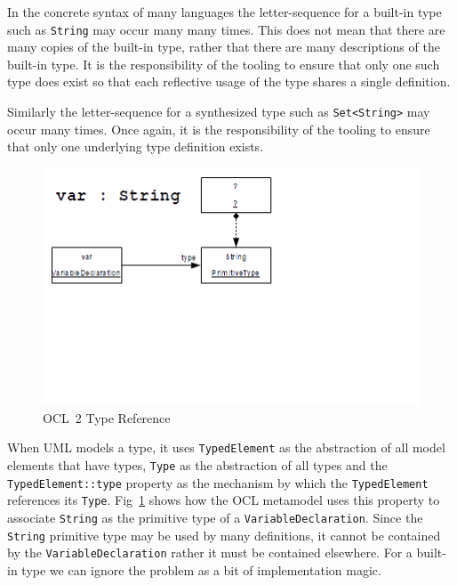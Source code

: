 \documentclass{jot}
\begin{document}
In the concrete syntax of many languages the letter-sequence for a built-in type such as \verb$String$ may occur many many times. This does not mean that there are many copies of the built-in type, rather that there are many descriptions of the built-in type. It is the responsibility of the tooling to ensure that only one such type does exist so that each reflective usage of the type shares a single definition.

Similarly the letter-sequence for a synthesized type such as \verb$Set<String>$ may occur many times. Once again, it is the responsibility of the tooling to ensure that only one underlying type definition exists.

\begin{figure}
	\begin{center}
		\includegraphics[width=4.5in]{OCL2TypeReference.png}
	\end{center}
	\vspace{-110pt}
	\caption{OCL~2 Type Reference}
	\label{fig:OCL2TypeReference}
\end{figure}

When UML models a type, it uses \verb$TypedElement$ as the abstraction of all model elements that have types, \verb$Type$ as the abstraction of all types and the \verb$TypedElement::type$ property as the mechanism by which the \verb$TypedElement$ references its \verb$Type$. Fig~\ref{fig:OCL2TypeReference} shows how the OCL metamodel uses this property to associate \verb$String$ as the primitive type of a \verb$VariableDeclaration$. Since the \verb$String$ primitive type may be used by many definitions, it cannot be contained by the \verb$VariableDeclaration$ rather it must be contained elsewhere. For a built-in type we can ignore the problem as a bit of implementation magic.
\end{document}
